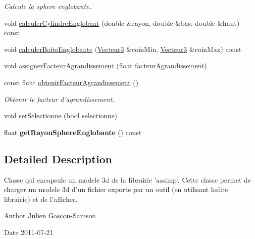 \begin{DoxyCompactItemize}
\begin{DoxyCompactList}\small\item\em Calcule la sphere englobante. \end{DoxyCompactList}\item 
void \hyperlink{group__inf2990_ga64446e685fdef334ae85392340735fbc}{calculer\-Cylindre\-Englobant} (double \&rayon, double \&bas, double \&haut) const 
\item 
void \hyperlink{group__inf2990_gac3a33e3e2675268653ae5846be055c21}{calculer\-Boite\-Englobante} (\hyperlink{group__utilitaire_ga541aa4837ad9250d3a248dc82ee9ad4d}{Vecteur3} \&coin\-Min, \hyperlink{group__utilitaire_ga541aa4837ad9250d3a248dc82ee9ad4d}{Vecteur3} \&coin\-Max) const 
\item 
void \hyperlink{group__inf2990_gae1ac7bcdbc6bbb75ae9b26edb3e06e4d}{assigner\-Facteur\-Agrandissement} (float facteur\-Agrandissement)
\item 
const float \hyperlink{group__inf2990_gac6181a36077d672f673879a7ddea628a}{obtenir\-Facteur\-Agrandissement} ()
\begin{DoxyCompactList}\small\item\em Obtenir le facteur d'agrandissement. \end{DoxyCompactList}\item 
void \hyperlink{class_modele3_d_aa7178546dff87e72d7c30300b9c4d2b9}{set\-Selectionne} (bool selectionne)
\item 
\hypertarget{class_modele3_d_ad00cb228449b856507c55ca20a6b5b48}{float {\bfseries get\-Rayon\-Sphere\-Englobante} () const }\label{class_modele3_d_ad00cb228449b856507c55ca20a6b5b48}

\end{DoxyCompactItemize}


\subsection{Detailed Description}
Classe qui encapsule un modele 3d de la librairie 'assimp'. Cette classe permet de charger un modele 3d d'un fichier exporte par un outil (en utilisant ladite librairie) et de l'afficher. 

\begin{DoxyAuthor}{Author}
Julien Gascon-\/\-Samson 
\end{DoxyAuthor}
\begin{DoxyDate}{Date}
2011-\/07-\/21 
\end{DoxyDate}



